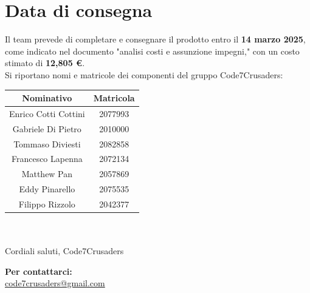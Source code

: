 \documentclass{article}
\begin{document}
\section{Data di consegna}
Il team prevede di completare e consegnare il prodotto entro il \textbf{14 marzo 2025},
come indicato nel documento "analisi costi e assunzione impegni," con un costo stimato di \textbf{12,805 \euro}.
\\
Si riportano nomi e matricole dei componenti del gruppo Code7Crusaders:
\\
\newline
\begin{center}
    \begin{tabular}{|c|c|}
        \hline
        \textbf{Nominativo} & \textbf{Matricola} \\
        \hline
         Enrico Cotti Cottini & 2077993\\
         Gabriele Di Pietro & 2010000\\
         Tommaso Diviesti & 2082858\\
         Francesco Lapenna & 2072134\\
         Matthew Pan & 2057869\\
         Eddy Pinarello & 2075535\\
         Filippo Rizzolo & 2042377\\
         \hline
    \end{tabular}
\end{center}
\\
\\
Cordiali saluti, Code7Crusaders

\begin{center}
    \textbf{Per contattarci:}\\
    \href{mailto:code7crusaders@gmail.com}{code7crusaders@gmail.com}
\end{center}
\end{document}
